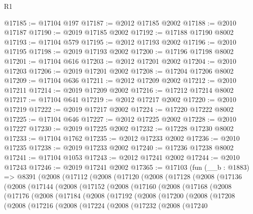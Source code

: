 \begin{lexlean}{R1}
\begin{coremodule}
@17185 := @17104 @197
@17187 := @2012 @17185 @2002
@17188 := @2010 @17187
@17190 := @2019 @17185 @2002
@17192 := @17188 @17190 @8002
@17193 := @17104 @579
@17195 := @2012 @17193 @2002
@17196 := @2010 @17195
@17198 := @2019 @17193 @2002
@17200 := @17196 @17198 @8002
@17201 := @17104 @616
@17203 := @2012 @17201 @2002
@17204 := @2010 @17203
@17206 := @2019 @17201 @2002
@17208 := @17204 @17206 @8002
@17209 := @17104 @636
@17211 := @2012 @17209 @2002
@17212 := @2010 @17211
@17214 := @2019 @17209 @2002
@17216 := @17212 @17214 @8002
@17217 := @17104 @641
@17219 := @2012 @17217 @2002
@17220 := @2010 @17219
@17222 := @2019 @17217 @2002
@17224 := @17220 @17222 @8002
@17225 := @17104 @646
@17227 := @2012 @17225 @2002
@17228 := @2010 @17227
@17230 := @2019 @17225 @2002
@17232 := @17228 @17230 @8002
@17233 := @17104 @1762
@17235 := @2012 @17233 @2002
@17236 := @2010 @17235
@17238 := @2019 @17233 @2002
@17240 := @17236 @17238 @8002
@17241 := @17104 @1053
@17243 := @2012 @17241 @2002
@17244 := @2010 @17243
@17246 := @2019 @17241 @2002
@17365 := @17103
    (fun (__b : @1883) =>
    @8391
      (@2008
        (@17112
          (@2008
            (@17120
              (@2008
                (@17128
                  (@2008
                    (@17136
                      (@2008
                        (@17144
                          (@2008
                            (@17152
                              (@2008
                                (@17160
                                  (@2008
                                    (@17168
                                      (@2008
                                        (@17176
                                          (@2008
                                            (@17184
                                              (@2008
                                                (@17192
                                                  (@2008
                                                    (@17200
                                                      (@2008
                                                        (@17208
                                                          (@2008
                                                            (@17216
                                                              (@2008
                                                                (@17224
                                                                  (@2008
                                                                    (@17232
                                                                      (@2008
                                                                        (@17240

\end{coremodule}
\end{lexlean}
